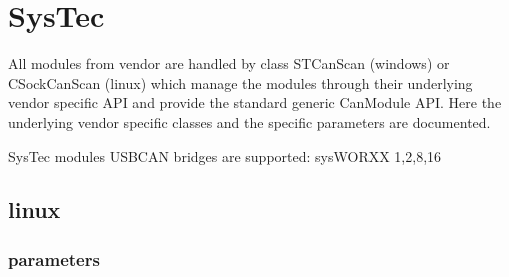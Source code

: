 \documentclass[a4paper,10pt,english]{sphinxmanual}
\begin{document}
\chapter{SysTec}
\label{\detokenize{vendors/systec:systec}}\label{\detokenize{vendors/systec::doc}}
\sphinxAtStartPar
All modules from vendor {\hyperref[\detokenize{vendors/systec:systec}]{}} are handled by class STCanScan (windows) or CSockCanScan (linux) which
manage the modules through their underlying vendor specific API and provide the standard generic CanModule API.
Here the underlying vendor specific classes and the specific parameters are documented.

\sphinxAtStartPar
SysTec modules USB\sphinxhyphen{}CAN bridges are supported: sysWORXX 1,2,8,16


\section{linux}
\label{\detokenize{vendors/systec:linux}}

\subsection{parameters}
\label{\detokenize{vendors/systec:parameters}}
\end{document}
